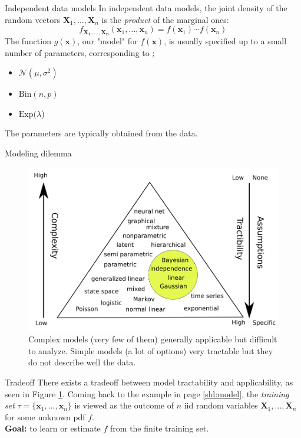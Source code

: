 \documentclass{beamer}
\begin{document}
\begin{frame}{Independent data models}
  In independent data models, the joint density of the random vectors $\bm{X}_1,\ldots,\bm{X}_n$ is the {\em product} of the marginal ones:
  \[
    f_{\bm{X_1},\ldots,\bm{X_n}}(\bm{x}_1,\ldots,\bm{x}_n)=f(\bm{x}_1)\cdots f(\bm{x}_n)  
  \]
  The function $g(\bm{x})$, our "model" for $f(\bm{x})$, is usually specified up to a small number of parameters, corresponding to \href{common probability distributions}:
  \begin{itemize}
    \item $\mathcal{N}(\mu,\sigma^2)$
    \item $\mathrm{Bin}(n,p)$
    \item $\mathrm{Exp}(\lambda$)
  \end{itemize}
  The parameters are typically obtained from the data.
\end{frame}

\begin{frame}{Modeling dilemma}
  \begin{figure}
    \includegraphics[width=0.7\linewidth]{dilemma}
    \caption{Complex models (very few of them) generally applicable but difficult to analyze. Simple models (a lot of options) very tractable but they do not describe well the data\cite{kroese2020}.}
    \label{fig:dilemma}
  \end{figure}
\end{frame}

\begin{frame}{Tradeoff}
  There exists a tradeoff between model tractability and applicability, as seen in Figure \ref{fig:dilemma}. Coming back to the example in page \ref{sld:model}, the {\em training set} $\tau = \{\bm{x}_1,\ldots,\bm{x}_n\}$ is viewed as the outcome of $n$ iid random variables $\bm{X}_1,\ldots,\bm{X}_n$ for some unknown pdf $f$.\\[2ex]

  {\bf Goal:} to learn or estimate $f$ from the finite training set.
\end{frame}
\end{document}
